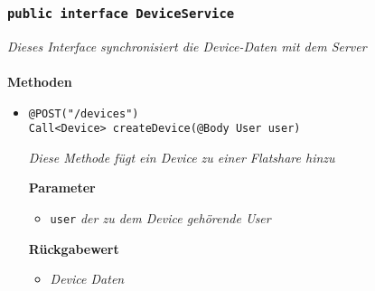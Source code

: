 	\subsubsection{\texttt{public interface DeviceService }}
\textit{Dieses Interface synchronisiert die Device-Daten mit dem Server}\\
\\
	\textbf{Methoden} \\
		\begin{itemize}
		\item\texttt{{@POST("/devices") \\ Call<Device> createDevice(@Body User user)}}

		\textit{Diese Methode fügt ein Device zu einer Flatshare hinzu}

		\textbf{Parameter} 
			\begin{itemize}
				\item\texttt{user}
		 		\textit{der zu dem Device gehörende User}
	 		\end{itemize}

		\textbf{Rückgabewert} 
		\begin{itemize}
		\item\textit{Device Daten}
		\end{itemize}

	 \end{itemize}